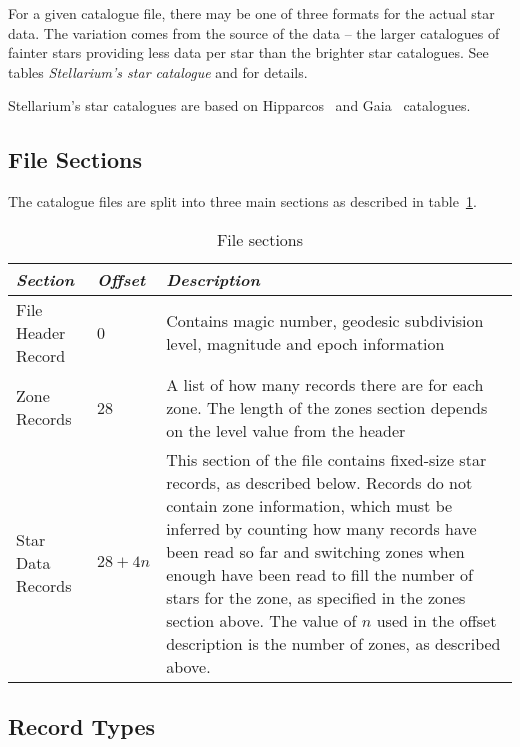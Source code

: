 For a given catalogue file, there may be one of three formats for the
actual star data. The variation comes from the source of the data -- the
larger catalogues of fainter stars providing less data per star than the
brighter star catalogues. See tables \emph{Stellarium's star catalogue}
and for details.

Stellarium's star catalogues are based on Hipparcos~\citep{1997ESASP1200.....E, 2012AstL...38..331A} and Gaia~\citep{2016A&A...595A...1G} catalogues.

\subsection{File Sections}%
\label{sec:Catalogues:stars:sections}

The catalogue files are split into three main sections as described in
table~\ref{tab:Catalogues:stars:sections}.

\begin{table}[htb]
\begin{tabularx}{\textwidth}{l l X}\toprule
\emph{Section} & \emph{Offset} & \emph{Description}\\\midrule
File Header Record &  0        & Contains magic number, geodesic subdivision level, magnitude and epoch information\\%
Zone Records       & 28        & A list of how many records there are for each zone.
                                 The length of the zones section depends on the level value from the header\\%
Star Data Records  & $28+4n$   & This section of the file contains fixed-size star records, as described below. 
                                 Records do not contain zone information, which must be inferred by counting 
                                 how many records have been read so far and switching zones when enough have been read 
                                 to fill the number of stars for the zone, as specified in the zones section above. 
                                 The value of $n$ used in the offset description is the number of zones, as described above.\\\bottomrule
\end{tabularx}
\caption{File sections}
\label{tab:Catalogues:stars:sections}
\end{table}

\subsection{Record Types}%
\label{sec:Catalogues:stars:record:types}


